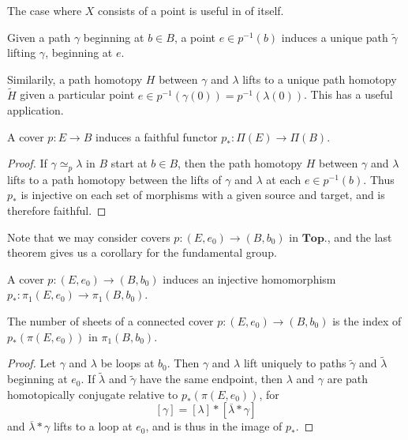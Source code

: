 The case where $X$ consists of a point is useful in of itself.

\begin{corollary}
    Given a path $\gamma$ beginning at $b \in B$, a point $e \in p^{-1}(b)$ induces a unique path $\tilde{\gamma}$ lifting $\gamma$, beginning at $e$.
\end{corollary}

Similarily, a path homotopy $H$ between $\gamma$ and $\lambda$ lifts to a unique path homotopy $\tilde{H}$ given a particular point $e \in p^{-1}(\gamma(0)) = p^{-1}(\lambda(0))$. This has a useful application.

\begin{theorem}
    A cover $p: E \to B$ induces a faithful functor $p_*: \Pi(E) \to \Pi(B)$.
\end{theorem}
\begin{proof}
    If $\gamma \simeq_p \lambda$ in $B$ start at $b \in B$, then the path homotopy $H$ between $\gamma$ and $\lambda$ lifts to a path homotopy between the lifts of $\gamma$ and $\lambda$ at each $e \in p^{-1}(b)$. Thus $p_*$ is injective on each set of morphisms with a given source and target, and is therefore faithful.
\end{proof}

Note that we may consider covers $p: (E,e_0) \to (B,b_0)$ in $\textbf{Top.}$, and the last theorem gives us a corollary for the fundamental group.

\begin{corollary}
    A cover $p: (E,e_0) \to (B,b_0)$ induces an injective homomorphism $p_*: \pi_1(E,e_0) \to \pi_1(B,b_0)$.
\end{corollary}

\begin{theorem}
    The number of sheets of a connected cover $p: (E,e_0) \to (B,b_0)$ is the index of $p_*(\pi(E,e_0))$ in $\pi_1(B,b_0)$.
\end{theorem}
\begin{proof}
    Let $\gamma$ and $\lambda$ be loops at $b_0$. Then $\gamma$ and $\lambda$ lift uniquely to paths $\tilde{\gamma}$ and $\tilde{\lambda}$ beginning at $e_0$. If $\tilde{\lambda}$ and $\tilde{\gamma}$ have the same endpoint, then $\lambda$ and $\gamma$ are path homotopically conjugate relative to $p_*(\pi(E,e_0))$, for
    \[ [\gamma] = [\lambda] * [\overline{\lambda} * \gamma] \]
    and $\overline{\lambda} * \gamma$ lifts to a loop at $e_0$, and is thus in the image of $p_*$.
\end{proof}

